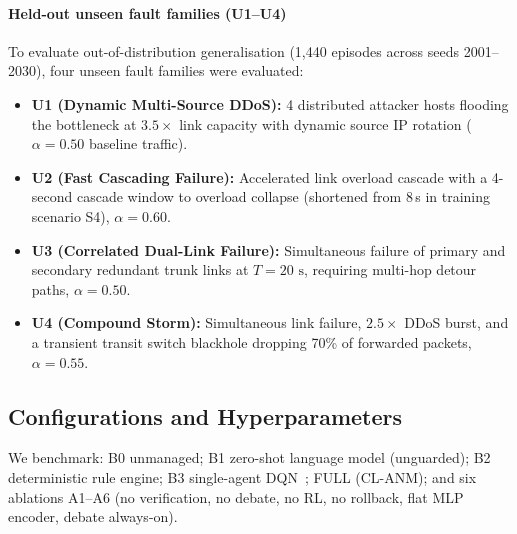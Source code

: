 \documentclass[sn-mathphys,Numbered]{sn-jnl}
\begin{document}
\paragraph{Held-out unseen fault families (U1--U4)} To evaluate out-of-distribution generalisation (1,440 episodes across seeds 2001--2030), four unseen fault families were evaluated:
\begin{itemize}
\item \textbf{U1 (Dynamic Multi-Source DDoS):} 4 distributed attacker hosts flooding the bottleneck at $3.5\times$ link capacity with dynamic source IP rotation ($\alpha=0.50$ baseline traffic).
\item \textbf{U2 (Fast Cascading Failure):} Accelerated link overload cascade with a 4-second cascade window to overload collapse (shortened from 8\,s in training scenario S4), $\alpha=0.60$.
\item \textbf{U3 (Correlated Dual-Link Failure):} Simultaneous failure of primary and secondary redundant trunk links at $T=20\text{ s}$, requiring multi-hop detour paths, $\alpha=0.50$.
\item \textbf{U4 (Compound Storm):} Simultaneous link failure, $2.5\times$ DDoS burst, and a transient transit switch blackhole dropping 70\% of forwarded packets, $\alpha=0.55$.
\end{itemize}

\subsection{Configurations and Hyperparameters}
We benchmark: B0 unmanaged; B1 zero-shot language model (unguarded); B2 deterministic rule engine; B3 single-agent DQN~\cite{dqn}; FULL (CL-ANM); and six ablations A1--A6 (no verification, no debate, no RL, no rollback, flat MLP encoder, debate always-on).
\end{document}
